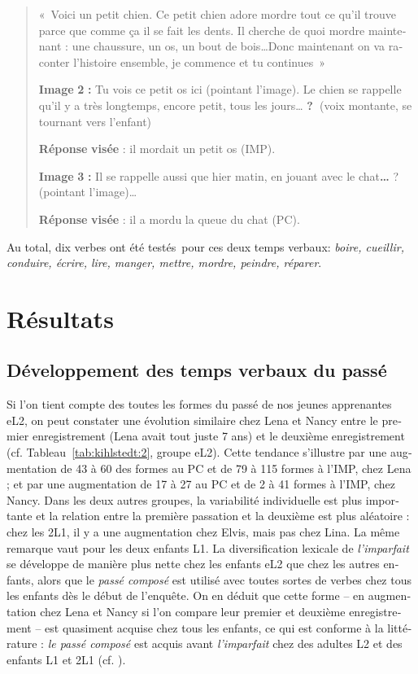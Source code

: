\documentclass[french, output=paper]{langscibook}
\begin{document}
\begin{otherlanguage}{french}
\begin{quote}
«~Voici un petit chien. Ce petit chien adore mordre tout ce qu’il trouve parce que comme ça il se fait les dents. Il cherche de quoi mordre maintenant : une chaussure, un os, un bout de bois…Donc maintenant on va raconter l’histoire ensemble, je commence et tu continues~»


\textbf{Image} \textbf{2} \textbf{:} Tu vois ce petit os ici (pointant l’image). Le chien se rappelle qu’il y a très longtemps, encore   petit, tous les jours… \textbf{?~}(voix montante, se tournant vers l’enfant)



\textbf{Réponse} \textbf{visée} : il mordait un petit os (IMP).



\textbf{Image} \textbf{3} \textbf{:} Il se rappelle aussi que hier matin, en jouant avec le chat\textbf{…} ? (pointant l’image)…



\textbf{Réponse} \textbf{visée} : il a mordu la queue du chat (PC).
\end{quote}


Au total, dix verbes ont été testés~pour ces deux temps verbaux: \textit{boire, cueillir, conduire, écrire, lire, manger, mettre, mordre, peindre, réparer}. 


\section{Résultats}\label{sec:kihlstedt:5}
\subsection{Développement des temps verbaux du passé}\label{sec:kihlstedt:5.1}\largerpage

Si l’on tient compte des toutes les formes du passé de nos jeunes apprenantes eL2, on peut constater une évolution similaire chez Lena et Nancy entre le premier enregistrement (Lena avait tout juste 7 ans) et le deuxième enregistrement (cf. Tableau~\ref{tab:kihlstedt:2}, groupe eL2). Cette tendance s’illustre par une augmentation de 43 à 60 des formes au PC et de 79 à 115 formes à l’IMP, chez Lena ; et par une augmentation de 17 à 27 au PC et de 2 à 41 formes à l’IMP, chez Nancy. Dans les deux autres groupes, la variabilité individuelle est plus importante et la relation entre la première passation et la deuxième est plus aléatoire : chez les 2L1, il y a une augmentation chez Elvis, mais pas chez Lina. La même remarque vaut pour les deux enfants L1. La diversification lexicale de \textit{l’imparfait} se développe de manière plus nette chez les enfants eL2 que chez les autres enfants, alors que le \textit{passé composé} est utilisé avec toutes sortes de verbes chez tous les enfants dès le début de l’enquête. On en déduit que cette forme -- en augmentation chez Lena et Nancy si l’on compare leur premier et deuxième enregistrement -- est quasiment acquise chez tous les enfants, ce qui est conforme à la littérature : \textit{le passé composé} est acquis avant \textit{l’imparfait} chez des adultes L2 et des enfants L1 et 2L1 (cf. ).



\end{otherlanguage}
\end{document}
